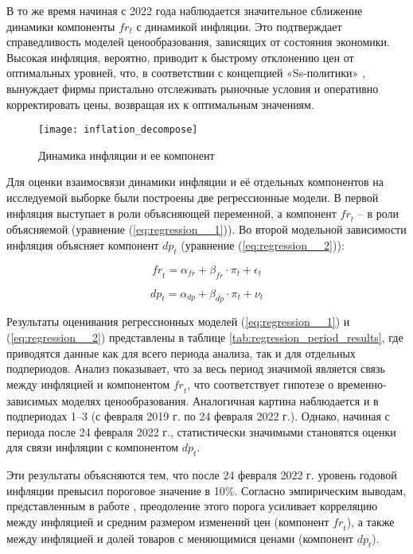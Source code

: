 В то же время начиная с 2022 года наблюдается значительное сближение динамики компоненты $fr_t$ с динамикой инфляции. Это подтверждает справедливость моделей ценообразования, зависящих от состояния экономики. Высокая инфляция, вероятно, приводит к быстрому отклонению цен от оптимальных уровней, что, в соответствии с концепцией «Ss-политики» \cite{SheshinskiWeiss1977, Sheshinski1983}, вынуждает фирмы пристально отслеживать рыночные условия и оперативно корректировать цены, возвращая их к оптимальным значениям.

\begin{figure}[h]
	\centering
	\texttt{[image: inflation\_decompose]}
	\caption{Динамика инфляции и ее компонент}
	\label{fig:inflation_decompose}
\end{figure}

Для оценки взаимосвязи динамики инфляции и её отдельных компонентов на исследуемой выборке были построены две регрессионные модели. В первой инфляция выступает в роли объясняющей переменной, а компонент $\textit{fr}_{t}$ – в роли объясняемой (уравнение (\ref{eq:regression__1})). Во второй модельной зависимости инфляция объясняет компонент $\textit{dp}_{t}$ (уравнение (\ref{eq:regression__2})):

\begin{equation}
	\textit{fr}_{t} = \alpha_{fr} + \beta_{fr} \cdot \pi_{t} + \epsilon_{t}
	\label{eq:regression__1}
\end{equation}

\begin{equation}
	\textit{dp}_{t} = \alpha_{dp} + \beta_{dp} \cdot \pi_{t} + \nu_{t}
	\label{eq:regression__2}
\end{equation}

Результаты оценивания регрессионных моделей (\ref{eq:regression__1}) и (\ref{eq:regression__2}) представлены в таблице \ref{tab:regression_period_results}, где приводятся данные как для всего периода анализа, так и для отдельных подпериодов. Анализ показывает, что за весь период значимой является связь между инфляцией и компонентом $\textit{fr}_{t}$, что соответствует гипотезе о временно-зависимых моделях ценообразования. Аналогичная картина наблюдается и в подпериодах 1–3 (с февраля 2019 г. по 24 февраля 2022 г.). Однако, начиная с периода после 24 февраля 2022 г., статистически значимыми становятся оценки для связи инфляции с компонентом $\textit{dp}_{t}$.

Эти результаты объясняются тем, что после 24 февраля 2022 г. уровень годовой инфляции превысил пороговое значение в 10\%. Согласно эмпирическим выводам, представленным в работе \cite{gagnon2009}, преодоление этого порога усиливает корреляцию между инфляцией и средним размером изменений цен (компонент $\textit{fr}_{t}$), а также между инфляцией и долей товаров с меняющимися ценами (компонент $\textit{dp}_{t}$).

